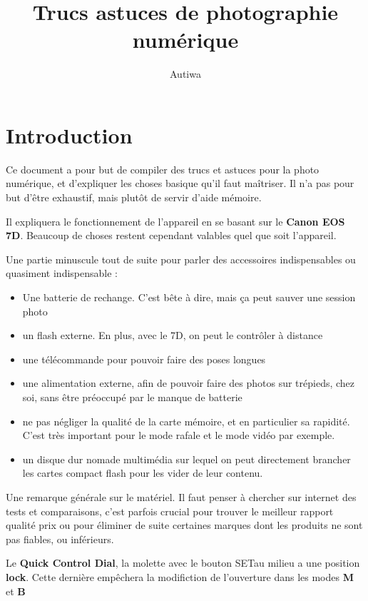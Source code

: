 \documentclass[a4paper,twoside]{article}
\title{Trucs astuces de photographie numérique}
\author{Autiwa}
\begin{document}

\tableofcontents
\newpage
\section{Introduction}
Ce document a pour but de compiler des trucs et astuces pour la photo numérique, et d'expliquer les choses basique qu'il faut maîtriser. Il n'a pas pour but d'être exhaustif, mais plutôt de servir d'aide mémoire. 

Il expliquera le fonctionnement de l'appareil en se basant sur le \textbf{Canon EOS 7D}. Beaucoup de choses restent cependant valables quel que soit l'appareil.

\bigskip

Une partie minuscule tout de suite pour parler des accessoires indispensables ou quasiment indispensable :
\begin{itemize}
\item Une batterie de rechange. C'est bête à dire, mais ça peut sauver une session photo
\item un flash externe. En plus, avec le 7D, on peut le contrôler à distance
\item une télécommande pour pouvoir faire des poses longues
\item une alimentation externe, afin de pouvoir faire des photos sur trépieds, chez soi, sans être préoccupé par le manque de batterie
\item ne pas négliger la qualité de la carte mémoire, et en particulier sa rapidité. C'est très important pour le mode rafale et le mode vidéo par exemple.
\item un disque dur nomade multimédia sur lequel on peut directement brancher les cartes compact flash pour les vider de leur contenu.
\end{itemize}

\begin{remarque}
Une remarque générale sur le matériel. Il faut penser à chercher sur internet des tests et comparaisons, c'est parfois crucial pour trouver le meilleur rapport qualité prix ou pour éliminer de suite certaines marques dont les produits ne sont pas fiables, ou inférieurs.
\end{remarque}

\begin{attention}
Le \textbf{Quick Control Dial}, la molette avec le bouton \og SET\fg au milieu a une position \textbf{lock}. Cette dernière empêchera la modifiction de l'ouverture dans les modes \textbf{M} et \textbf{B}
\end{attention}
\end{document}
